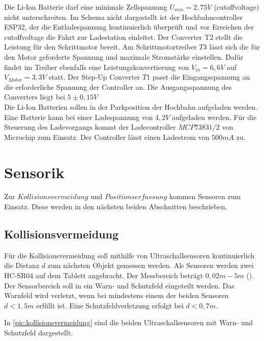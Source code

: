 Die Li-Ion Batterie darf eine minimale Zellspannung $U_{min} =2,75V$ (\acrshort{cutoffvoltage}) nicht unterschreiten. Im Schema nicht dargestellt ist der Hochbahncontroller ESP32, der die Entladespannung kontinuierlich überprüft und vor Erreichen der \acrshort{cutoffvoltage} die Fahrt zur Ladestation einleitet. Der Converter T2 stellt die Leistung für den Schrittmotor bereit. Am Schrittmotortreiber $T3$ lässt sich die für den Motor geforderte Spannung und maximale Stromstärke einstellen. Dafür findet im Treiber ebenfalls eine Leistungskonvertierung von $V_{in}=6,6V$ auf $V_{Motor}=3,3V$ statt. Der Step-Up Converter $T1$ passt die Eingangsspannung an die erforderliche Spannung der Controller an. Die Ausgangsspannung des Converters liegt bei $5 \pm 0,15 V$ \\

Die Li-Ion Batterien sollen in der Parkposition der Hochbahn aufgeladen werden. Eine Batterie kann bei einer Ladespannung von $4,2V$ aufgeladen werden. Für die Steuerung des Ladevorgangs kommt der Ladecontroller $MCP73831/2$ von Microchip zum Einsatz. Der Controller lässt einen Ladestrom von $500mA$ zu. 


\newpage

\section{Sensorik}
\label{sec:konzeptSensorik}
Zur $Kollisionsvermeidung$ und $Positionserfassung$ kommen Sensoren zum Einsatz. Diese werden in den nächsten beiden Abschnitten beschrieben.

\subsection{Kollisionsvermeidung}
\label{sec:konzeptKollisionsvermeidung}
Für die Kollisionsvermeidung soll mithilfe von Ultraschallsensoren kontinuierlich die Distanz $d$ zum nächsten Objekt gemessen werden. Als Sensoren werden zwei HC-SR04 auf dem Tablett angebracht. Der Messbereich beträgt $0,02m - 5m$ (\cite{hcrs04}). Der Sensorbereich soll in ein Warn- und Schutzfeld eingeteilt werden. Das Warnfeld wird verletzt, wenn bei mindestens einem der beiden Sensoren $d<1,5m$ erfüllt ist. Eine Schutzfeldverletzung erfolgt bei $d<0,7m$. 

In \autoref{pic:kollisionsvermeidung} sind die beiden Ultraschallsensoren mit Warn- und Schutzfeld dargestellt. 

